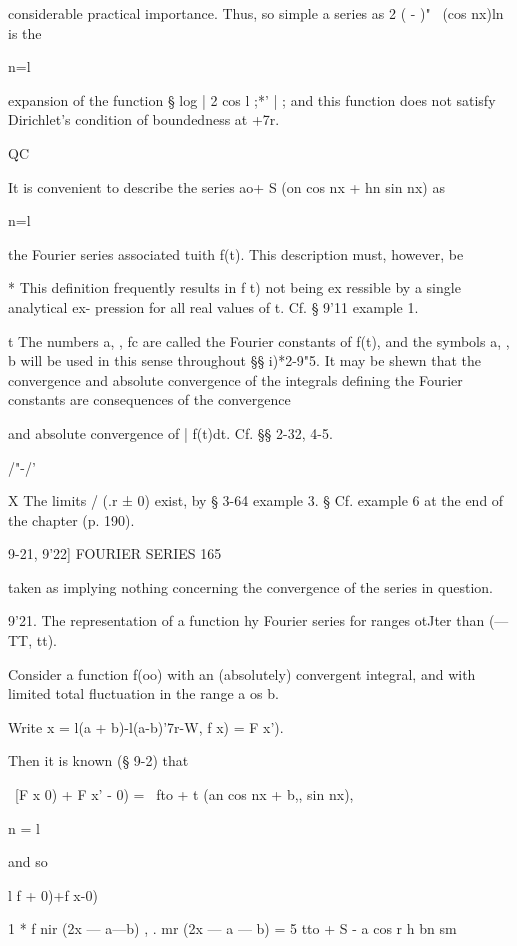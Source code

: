considerable practical importance. Thus, so simple a series as 2 ( -
)"~ (cos nx)ln is the

n=l

expansion of the function § log | 2 cos l ;*' | ; and this function
does not satisfy Dirichlet's condition of boundedness at +7r.

QC

It is convenient to describe the series ao+ S (on cos nx + hn sin nx)
as

n=l

the Fourier series associated tuith f(t). This description must,
however, be

* This definition frequently results in f t) not being ex ressible by
a single analytical ex- pression for all real values of t. Cf. § 9'11
example 1.

t The numbers a, , fc are called the Fourier constants of f(t), and
the symbols a, , b will be used in this sense throughout §§ i)*2-9"5.
It may be shewn that the convergence and absolute convergence of the
integrals defining the Fourier constants are consequences of the
convergence

and absolute convergence of | f(t)dt. Cf. §§ 2-32, 4-5.



/"-/'



X The limits / (.r ± 0) exist, by § 3-64 example 3. § Cf. example 6 at
the end of the chapter (p. 190).



9-21, 9'22] FOURIER SERIES 165

taken as implying nothing concerning the convergence of the series in
question.

9'21. The representation of a function hy Fourier series for ranges
otJter than (— TT, tt).

Consider a function f(oo) with an (absolutely) convergent integral,
and with limited total fluctuation in the range a os b.

Write x = l(a + b)-l(a-b)'7r-W, f x) = F x').

Then it is known (§ 9-2) that

\ [F x 0) + F x' - 0) = \ fto + t (an cos nx + b,, sin nx),

n = l

and so

l f + 0)+f x-0)

1 * f nir (2x — a—b) , . mr (2x — a — b) = 5 tto + S - a cos r h bn sm




